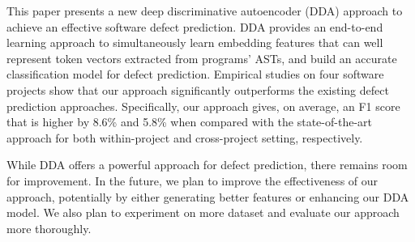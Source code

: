 
This paper presents a new deep discriminative autoencoder (DDA) approach to achieve an effective software defect prediction. DDA provides an end-to-end learning approach to simultaneously learn embedding features that can well represent token vectors extracted from programs' ASTs, and build an accurate classification model for defect prediction. Empirical studies on four software projects show that our approach significantly outperforms the existing defect prediction approaches. Specifically, our approach gives, on average, an F1 score that is higher by 8.6\% and 5.8\% when compared with the state-of-the-art approach for both within-project and cross-project setting, respectively. 

While DDA offers a powerful approach for defect prediction, there remains room for improvement. In the future, we plan to improve the effectiveness of our approach, potentially by either generating better features or enhancing our DDA model. We also plan to experiment on more dataset and evaluate our approach more thoroughly. 


%

